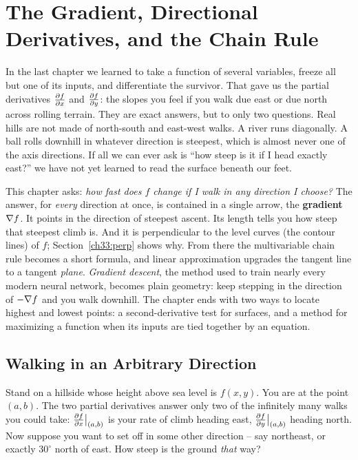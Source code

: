 \chapter{The Gradient, Directional Derivatives, and the Chain Rule}
\label{ch33:gradient-directional-chain-rule}

In the last chapter we learned to take a function of several variables, freeze
all but one of its inputs, and differentiate the survivor. That gave us the
partial derivatives $\frac{\partial f}{\partial x}$ and $\frac{\partial f}{\partial y}$: the slopes you feel if you
walk due east or due north across rolling terrain. They are exact answers, but to
only two questions. Real hills are not made of
north-south and east-west walks. A river runs diagonally. A ball rolls downhill
in whatever direction is steepest, which is almost never one of the axis
directions. If all we can ever ask is ``how steep is it if I head exactly east?''
we have not yet learned to read the surface beneath our feet.

This chapter asks: \emph{how fast does $f$ change if I walk in any direction I
choose?} The answer, for \emph{every} direction at once, is contained in a single
arrow, the \textbf{gradient} $\nabla f$. It points in the direction of steepest
ascent. Its length tells you how steep that steepest climb is. And it is
perpendicular to the level curves (the contour lines) of $f$; Section~\ref{ch33:perp}
shows why. From there the multivariable chain rule becomes a short formula, and
linear approximation upgrades the tangent line to a tangent \emph{plane}.
\emph{Gradient descent}, the method used to train nearly every modern neural
network, becomes plain geometry: keep stepping in the direction of $-\nabla f$ and
you walk downhill. The chapter ends with two ways to locate highest and lowest
points: a second-derivative test for surfaces, and a method for maximizing a
function when its inputs are tied together by an equation.

\chapterline

\section{Walking in an Arbitrary Direction}
\label{ch33:directional}

Stand on a hillside whose height above sea level is $f(x,y)$. You are at the
point $(a,b)$. The two partial derivatives answer only two of the infinitely many
walks you could take: $\frac{\partial f}{\partial x}\big|_{(a,b)}$ is your rate of climb heading
east, $\frac{\partial f}{\partial y}\big|_{(a,b)}$ heading north. Now suppose you want to set off in
some other direction -- say northeast, or exactly $30^\circ$ north of east. How
steep is the ground \emph{that} way?

